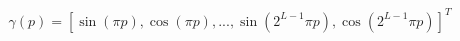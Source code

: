 \begin{equation}
    \gamma(p) = [\sin(\pi p), \cos(\pi p), ..., \sin(2^{L-1}\pi p), \cos(2^{L-1}\pi p)]^T
    \label{eq:positionalencoding}
\end{equation}
